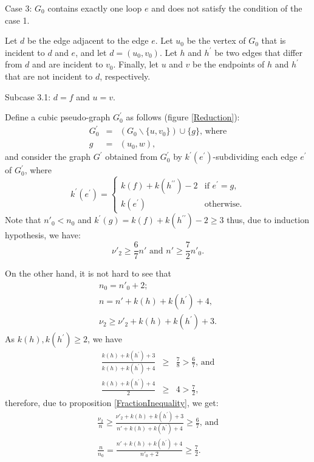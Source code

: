 \documentclass[fleqn,12pt,twoside]{article}
\newenvironment{proof}[1][Proof.]{\begin{trivlist}
\item[\hskip \labelsep {\bfseries #1}]}{\end{trivlist}}
\begin{document}
\begin{proof}
Case 3: $G_{0}$ contains exactly one loop $e$ and does not satisfy
the condition of the case 1.

Let $d$ be the edge adjacent to the edge $e$. Let $u_{0}$ be the vertex of $G_{0}$ that is incident to $d$ and $e$, and let $d=(u_{0},v_{0})$.
Let $h$
and $h^{\prime }$ be two edges that differ from $d$ and are incident to $v_{0}$. Finally, let $u$ and $v$ be the endpoints of $h$ and
$h^{\prime }$ that are not incident to $d$, respectively.

Subcase 3.1: $d=f$ and $u=v$.

Define a cubic pseudo-graph $G_{0}^{\prime }$ as follows (figure \ref {Reduction}):\begin{eqnarray*}
G_{0}^{\prime } &=&(G_{0}\backslash \{u,v_{0}\})\cup \{g\}\text{, where} \\
g &=&(u_{0},w)\text{,}
\end{eqnarray*}and consider the graph $G^{\prime }$ obtained from $G_{0}^{\prime }$ by $k^{\prime }(e^{\prime })$-subdividing each edge $e^{\prime }$ of $G_{0}^{\prime }$, where
\begin{equation*}
k^{\prime }(e^{\prime })=\left\{
\begin{array}{ll}
k(f)+k(h^{\prime \prime })-2 & \text{if }e^{\prime }=g\text{,} \\
k(e^{\prime }) & \text{otherwise.}\end{array}\right.
\end{equation*}Note that $n'_0 < n_0$ and $k^{\prime }(g)=k(f)+k(h^{\prime \prime
})-2\geq 3$
thus, due to induction hypothesis, we have:\begin{equation*}
\nu' _{2}\geq \frac{6}{7}n' \text{ and }n'\geq \frac{7}{2}n'_0.
\end{equation*}

On the other hand, it is not hard to see that
\begin{gather*}
n_0 =n'_0 +2;
\\
n =n'+k(h)+k(h^{\prime })+4\text{,} \\
\nu _{2}\geq \nu' _{2}+k(h)+k(h^{\prime })+3.
\end{gather*}As $k(h),k(h^{\prime })\geq 2$, we have
\begin{eqnarray*}
\frac{k(h)+k(h^{\prime })+3}{k(h)+k(h^{\prime })+4} &\geq &\frac{7}{8}>\frac{6}{7}\text{, and} \\
\frac{k(h)+k(h^{\prime })+4}{2} &\geq &4>\frac{7}{2},
\end{eqnarray*}therefore, due to proposition \ref{FractionInequality}, we get:\begin{gather*}
\frac{\nu _{2}}{n}\geq \frac{\nu' _{2}+k(h)+k(h^{\prime })+3}{n'
+k(h)+k(h^{\prime })+4}\geq \frac{6}{7}\text{, and} \\
\frac{n }{n_0 }=\frac{n'+k(h)+k(h^{\prime })+4}{n'_0+2}\geq \frac{7}{2}.
\end{gather*}


\end{proof}
\end{document}

